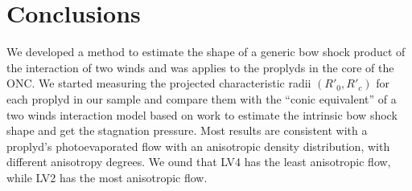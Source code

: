 \section{Conclusions}
\label{sec:conc}

\newcommand\thC{\(\theta^1\)\,Ori~C}

We developed a method to estimate the shape of a generic bow shock product of the
interaction of two winds and was applies to the proplyds in the core of the ONC.
We started measuring the projected characteristic radii $(R'_0,R'_c)$ for each proplyd in our
sample and compare them with the ``conic equivalent'' of a two winds interaction model based 
on \CRW{} work to estimate the intrinsic bow shock shape and get the stagnation pressure.
Most results are consistent with a proplyd's photoevaporated flow with an anisotropic density
distribution, with different anisotropy degrees. We ound that LV4 has the least anisotropic flow,
while LV2 has the most anisotropic flow.

